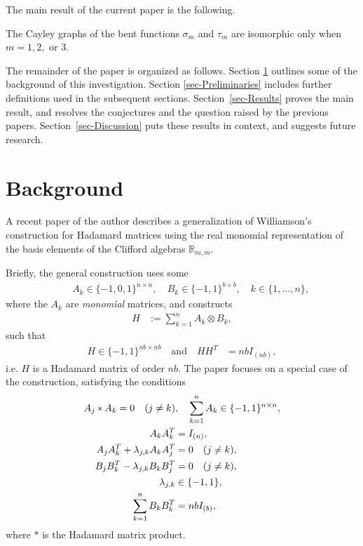 \documentclass[11pt,a4paper]{jacodesmath}
\newcommand{\mb}[1]{\mathbb{#1}}
\newcommand{\R}{\mb{R}}
\begin{document}
The main result of the current paper is the following.
\begin{theorem}\label{HR-non-imomorphic-theorem}
The Cayley graphs of the bent functions $\sigma_m$ and $\tau_m$ are isomorphic only when $m=1, 2,$
or $3.$
\end{theorem}

The remainder of the paper is organized as follows.
Section \ref{sec-Background} outlines some of the background of this investigation.
Section \ref{sec-Preliminaries} includes further definitions used in the subsequent sections.
Section~\ref{sec-Results} proves the main result, and resolves the conjectures and the question
raised by the previous papers.
Section~\ref{sec-Discussion} puts these results in context, and suggests future research.

\section{Background}\label{sec-Background}
A recent paper of the author \cite{Leo14Constructions} describes a generalization of
Williamson's construction for Hada\-mard matrices \cite{Wil44}
using the real monomial representation of the basis elements of the Clifford algebras $\R_{m,m}$.

Briefly, the general construction uses some
\begin{align*}
%
\quad &A_k \in \{-1,0,1\}^{n \times n}, \quad B_k \in \{-1,1\}^{b \times b},
\quad k \in \{1,\ldots,n\},
%
\end{align*}
%
where the $A_k$ are \emph{monomial} matrices,
and constructs
%
\begin{align}
%
H &:= \sum_{k=1}^n A_k \otimes B_k,
\tag{H0}
%
\end{align}
%
such that
%
\begin{align}
%
H \in \{-1,1\}^{n b \times n b}
\quad
\text{and}
\quad
H H^T &= n b I_{(n b)},
\tag{H1}
%
\end{align}
%
i.e. $H$ is a Hada\-mard matrix of order $n b$.
The paper \cite{Leo14Constructions} focuses on a special case of the construction,
satisfying the conditions
%
\begin{align}
%
 A_j \ast A_k = 0 \quad (j \neq k)&, \quad \sum_{k=1}^n A_k \in \{-1,1\}^{n \times n},
\notag
\\
 A_k A_k^T &= I_{(n)},
\notag
\\
 A_j A_k^T + \lambda_{j,k} A_k A_j^T &= 0 \quad (j \neq k),
\label{constructions-4}
\\
 B_j B_k^T - \lambda_{j,k} B_k B_j^T &= 0 \quad (j \neq k),
\notag
\\
 \lambda_{j,k} &\in \{-1,1\},
\notag
\\
\sum_{k=1}^n  B_k B_k^T &= n b I_{(b)},
\notag
%
\end{align}
%
where $\ast$ is the Hada\-mard matrix product.
\end{document}

